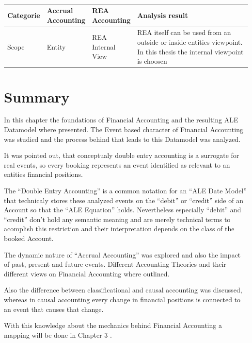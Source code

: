 \begin{table}
	\caption{}\label{tab:Elementary concepts}\caption*{}
	\begin{tabular}{|p{0.15\linewidth}|p{0.15\linewidth}|p{0.15\linewidth}|p{0.55\linewidth}|}
		\hline
		Categorie & Accrual Accounting & REA\textcopyright{} Accounting & Analysis result
		\\
		\hline
		Scope     & Entity             & REA Internal View              & REA itself can be used from an outside or
		inside entities viewpoint. In this thesis the internal viewpoint is
		choosen
		\\
	\end{tabular}
\end{table}

\section{Summary}
In this chapter the foundations of Financial Accounting and the resulting ALE Datamodel where presented.
The Event based character of Financial Accounting was studied and the process behind that leads to this Datamodel was analyzed.

It was pointed out, that conceptualy double entry accounting is a surrogate for real events, so every booking represents an event identified as relevant to an entities financial positions.

The \enquote{Double Entry Accounting} is a common notation for an \enquote{ALE Date Model} that technicaly stores these analyzed events on the \enquote{debit} or \enquote{credit} side of an Account so that the \enquote{ALE Equation} holds.
Nevertheless especially \enquote{debit} and \enquote{credit} don't hold any semantic meaning and are merely technical terms to acomplish this restriction and their interpretation depends on the class of the booked Account.

The dynamic nature of \enquote{Accrual Accounting} was explored and also the impact of past, present and future events.
Different Accounting Theories and their different views on Financial Accounting where outlined.

Also the difference between classificational and causal accounting was discussed, whereas in causal accounting every change in financial positions is connected to an event that causes that change.

With this knowledge about the mechanics behind Financial Accounting a mapping will be done in Chapter 3 .